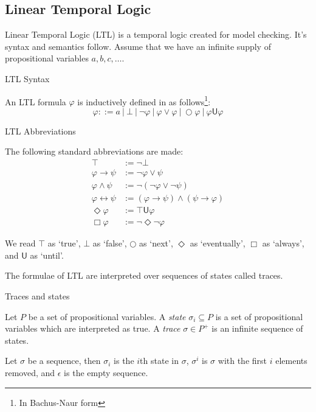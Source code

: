 \documentclass[a4paper]{article}
\newcommand{\U}{\mathsf{U}}
\begin{document}
\subsection{Linear Temporal Logic}
Linear Temporal Logic (LTL)\autocite{pnueli1977temporal} is a temporal logic created for model checking. It's syntax and semantics follow. Assume that we have an infinite supply of propositional variables $a,b,c,\dots$.
\begin{defn}{LTL Syntax}

  An LTL formula $\varphi$ is inductively defined in as follows\footnote{In Bachus-Naur form}:
  \[\varphi ::= a ~|~ \bot ~|~ \neg \varphi ~|~\varphi \lor \varphi ~|~ \bigcirc \varphi ~|~ \varphi \U\varphi\]
\end{defn}
\begin{notn}{LTL Abbreviations}\label{ltlabbrev}

  The following standard abbreviations are made:
  \begin{align*}
    \top &:= \neg \bot\\
    \varphi \to \psi &:= \neg \varphi \lor \psi\\
    \varphi \land \psi &:= \neg (\neg \varphi \lor \neg \psi)\\
    \varphi \leftrightarrow \psi &:= (\varphi \to \psi) \land (\psi \to \varphi)\\
    \Diamond \varphi &:= \top \U{} \varphi\\
    \Box \varphi &:= \neg\Diamond\neg\varphi
  \end{align*}
\end{notn}

We read $\top$ as `true', $\bot$ as `false', $\bigcirc$ as `next', $\Diamond$ as `eventually', $\Box$ as `always', and $\U$ as `until'.

The formulae of LTL are interpreted over sequences of states called traces.

\begin{defn}{Traces and states}

  Let $P$ be a set of propositional variables. A \emph{state} $\sigma_i \subseteq P$ is a set of propositional variables which are interpreted as true. A \emph{trace} $\sigma \in P^+$ is an infinite sequence of states.
\end{defn}

\begin{notn}
Let $\sigma$ be a sequence, then $\sigma_i$ is the $i$th state in $\sigma$, $\sigma^i$ is $\sigma$ with the first $i$ elements removed, and $\epsilon$ is the empty sequence.
\end{notn}
\end{document}
